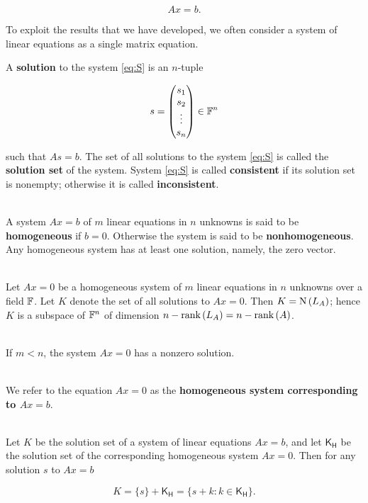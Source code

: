 \begin{definition}
	\[Ax = b.\]

	To exploit the results that we have developed, we often consider a system of linear equations as a single matrix equation.

	A \textbf{solution} to the system \eqref{eq:S} is an $n$-tuple

	\[s = \begin{pmatrix}
			s_1 \\ s_2 \\ \vdots \\ s_n
		\end{pmatrix} \in \mathbb{F}^n\]

	such that $As = b$. The set of all solutions to the system \eqref{eq:S} is called the \textbf{solution set} of the system. System \eqref{eq:S} is called \textbf{consistent} if its solution set is nonempty; otherwise it is called \textbf{inconsistent}.
\end{definition}

\begin{definition}
	\hfill\\
	A system $Ax = b$ of $m$ linear equations in $n$ unknowns is said to be \textbf{homogeneous} if $b = 0$. Otherwise the system is said to be \textbf{nonhomogeneous}.\\

	Any homogeneous system has at least one solution, namely, the zero vector.
\end{definition}

\begin{theorem}
	\hfill\\
	Let $Ax = 0$ be a homogeneous system of $m$ linear equations in $n$ unknowns over a field $\mathbb{F}$. Let $K$ denote the set of all solutions to $Ax = 0$. Then $K = \text{N}\left(L_A\right)$; hence $K$ is a subspace of $\mathbb{F}^n$ of dimension $n - \text{rank}\left(L_A\right) = n - \text{rank}\left(A\right)$.
\end{theorem}

\begin{corollary}
	\hfill\\
	If $m < n$, the system $Ax = 0$ has a nonzero solution.
\end{corollary}

\begin{definition}
	\hfill\\
	We refer to the equation $Ax = 0$ as the \textbf{homogeneous system corresponding to $Ax = b$}.
\end{definition}

\begin{theorem}
	\hfill\\
	Let $K$ be the solution set of a system of linear equations $Ax = b$, and let $\mathsf{K}_\mathsf{H}$ be the solution set of the corresponding homogeneous system $Ax = 0$. Then for any solution $s$ to $Ax = b$

	\[K = \{s\} + \mathsf{K}_\mathsf{H} = \{s + k: k \in \mathsf{K}_\mathsf{H}\}.\]
\end{theorem}

